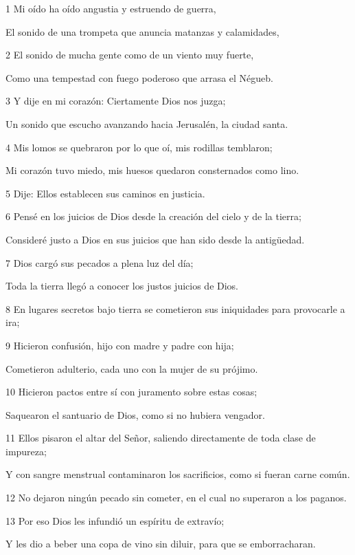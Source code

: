 \par 1 Mi oído ha oído angustia y estruendo de guerra,
\par     El sonido de una trompeta que anuncia matanzas y calamidades,
\par 2 El sonido de mucha gente como de un viento muy fuerte,
\par     Como una tempestad con fuego poderoso que arrasa el Négueb.
\par 3 Y dije en mi corazón: Ciertamente Dios nos juzga;
\par     Un sonido que escucho avanzando hacia Jerusalén, la ciudad santa.
\par 4 Mis lomos se quebraron por lo que oí, mis rodillas temblaron;
\par     Mi corazón tuvo miedo, mis huesos quedaron consternados como lino.
\par 5 Dije: Ellos establecen sus caminos en justicia.
\par   
\par 6 Pensé en los juicios de Dios desde la creación del cielo y de la tierra;
\par     Consideré justo a Dios en sus juicios que han sido desde la antigüedad.
\par 7 Dios cargó sus pecados a plena luz del día;
\par     Toda la tierra llegó a conocer los justos juicios de Dios.
\par 8 En lugares secretos bajo tierra se cometieron sus iniquidades para provocarle a ira;
\par 9 Hicieron confusión, hijo con madre y padre con hija;
\par     Cometieron adulterio, cada uno con la mujer de su prójimo.
\par 10 Hicieron pactos entre sí con juramento sobre estas cosas;
\par     Saquearon el santuario de Dios, como si no hubiera vengador.
\par 11 Ellos pisaron el altar del Señor, saliendo directamente de toda clase de impureza;
\par     Y con sangre menstrual contaminaron los sacrificios, como si fueran carne común.
\par 12 No dejaron ningún pecado sin cometer, en el cual no superaron a los paganos.
\par   
\par 13 Por eso Dios les infundió un espíritu de extravío;
\par     Y les dio a beber una copa de vino sin diluir, para que se emborracharan.
